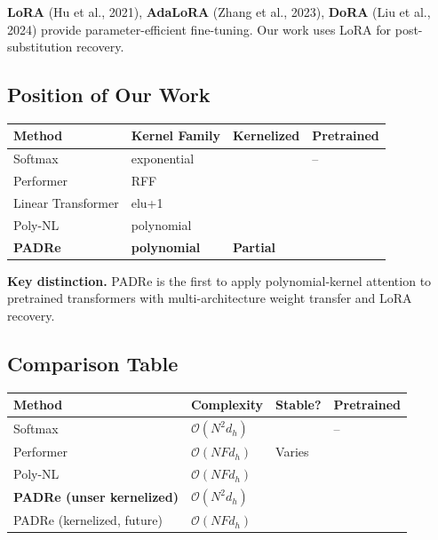 \textbf{LoRA} (Hu et al., 2021), \textbf{AdaLoRA} (Zhang et al., 2023), \textbf{DoRA} 
(Liu et al., 2024) provide parameter-efficient fine-tuning. Our work uses 
LoRA for post-substitution recovery.

\subsection{Position of Our Work}

\begin{table}[H]
\centering
\small
\begin{tabular}{llll}
\toprule
\textbf{Method} & \textbf{Kernel Family} & \textbf{Kernelized} & \textbf{Pretrained} \\
\midrule
Softmax & exponential &  & -- \\
Performer & RFF &  &  \\
Linear Transformer & elu+1 &  &  \\
Poly-NL & polynomial &  &  \\
\textbf{PADRe} & \textbf{polynomial} & \textbf{Partial} & \textbf{ } \\
\bottomrule
\end{tabular}
\end{table}

\textbf{Key distinction.} PADRe is the first to apply polynomial-kernel attention 
to pretrained transformers with multi-architecture weight transfer and 
LoRA recovery.



\subsection{Comparison Table}

\begin{table}[H]
\centering
\small
\begin{tabular}{llll}
\toprule
\textbf{Method} & \textbf{Complexity} & \textbf{Stable?} & \textbf{Pretrained} \\
\midrule
Softmax & $\mathcal{O}(N^2 d_h)$ &  & -- \\
Performer & $\mathcal{O}(N F d_h)$ & Varies &  \\
Poly-NL & $\mathcal{O}(N F d_h)$ &  &  \\
\textbf{PADRe (unser kernelized)} & $\mathcal{O}(N^2 d_h)$ &  & \textbf{ } \\
PADRe (kernelized, future) & $\mathcal{O}(N F d_h)$ &  &  \\
\bottomrule
\end{tabular}
\end{table}

